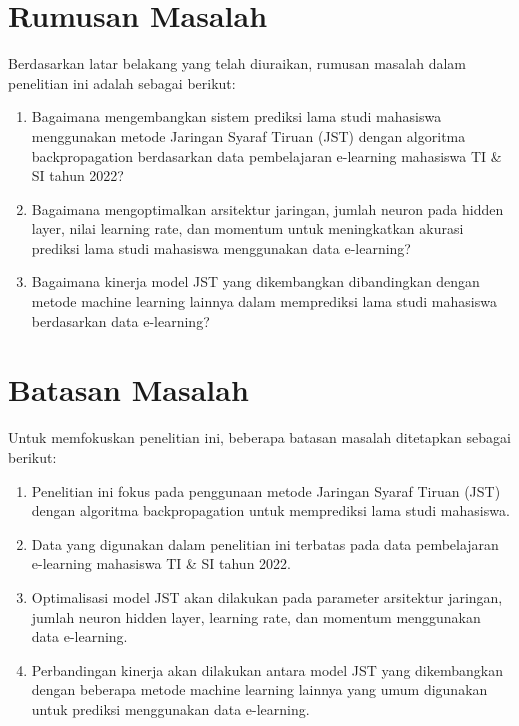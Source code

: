 \section{Rumusan Masalah}
Berdasarkan latar belakang yang telah diuraikan, rumusan masalah dalam penelitian ini adalah sebagai berikut:
    \begin{enumerate}
        \item Bagaimana mengembangkan sistem prediksi lama studi mahasiswa menggunakan metode Jaringan Syaraf Tiruan (JST) dengan algoritma backpropagation berdasarkan data pembelajaran e-learning mahasiswa TI \& SI tahun 2022?
        \item Bagaimana mengoptimalkan arsitektur jaringan, jumlah neuron pada hidden layer, nilai learning rate, dan momentum untuk meningkatkan akurasi prediksi lama studi mahasiswa menggunakan data e-learning?
        \item Bagaimana kinerja model JST yang dikembangkan dibandingkan dengan metode machine learning lainnya dalam memprediksi lama studi mahasiswa berdasarkan data e-learning?
    \end{enumerate}

\section{Batasan Masalah}
Untuk memfokuskan penelitian ini, beberapa batasan masalah ditetapkan sebagai berikut:
    \begin{enumerate}
        \item Penelitian ini fokus pada penggunaan metode Jaringan Syaraf Tiruan (JST) dengan algoritma backpropagation untuk memprediksi lama studi mahasiswa.
        \item Data yang digunakan dalam penelitian ini terbatas pada data pembelajaran e-learning mahasiswa TI \& SI tahun 2022.
        \item Optimalisasi model JST akan dilakukan pada parameter arsitektur jaringan, jumlah neuron hidden layer, learning rate, dan momentum menggunakan data e-learning.
        \item Perbandingan kinerja akan dilakukan antara model JST yang dikembangkan dengan beberapa metode machine learning lainnya yang umum digunakan untuk prediksi menggunakan data e-learning.
    \end{enumerate}

